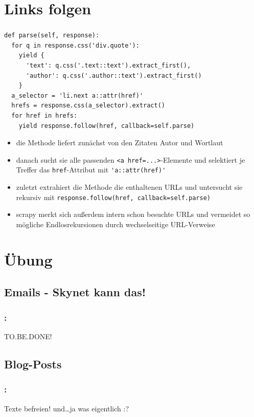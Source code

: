 \documentclass{beamer}
\begin{document}
\section{Links folgen}
\begin{frame}
	\frametitle{\insertsection{}}
	\begin{lstlisting}
def parse(self, response):
  for q in response.css('div.quote'):
    yield {
      'text': q.css('.text::text').extract_first(),
      'author': q.css('.author::text').extract_first()
    }
  a_selector = 'li.next a::attr(href)'
  hrefs = response.css(a_selector).extract()  
  for href in hrefs:    
    yield response.follow(href, callback=self.parse)
	\end{lstlisting}
	\begin{itemize}
		\item die Methode liefert zunächst von den Zitaten Autor und Wortlaut
		\item danach sucht sie alle passenden \lstinline|<a href=...>|-Elemente und selektiert je Treffer das \lstinline|href|-Attribut mit \lstinline|'a::attr(href)'| 
		
		\framebreak
		
		\item zuletzt extrahiert die Methode die enthaltenen URLs und untersucht sie rekursiv mit \lstinline|response.follow(href, callback=self.parse)| 
		\item scrapy merkt sich außerdem intern schon besuchte URLs und vermeidet so mögliche Endlosrekursionen durch wechselseitige URL-Verweise
	\end{itemize}
\end{frame}


\section{Übung}

\subsection{Emails - Skynet kann das!}
\begin{frame}
	\frametitle{\insertsection{}: \insertsubsection{}}
	\rightarrow TO.BE.DONE!
\end{frame}

\subsection{Blog-Posts}
\begin{frame}
	\frametitle{\insertsection{}: \insertsubsection{}}	
	\rightarrow Texte befreien! und\ldots ja was eigentlich :?
\end{frame}
\end{document}
